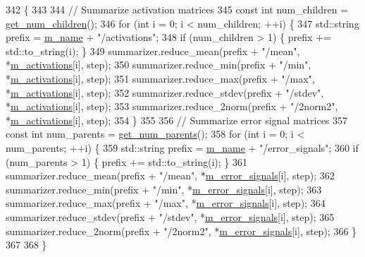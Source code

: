 \begin{DoxyCode}
342                                                                   \{
343 
344   \textcolor{comment}{// Summarize activation matrices}
345   \textcolor{keyword}{const} \textcolor{keywordtype}{int} num\_children = \hyperlink{classlbann_1_1Layer_a1409a117c31a7ea4f2c7a4d22a3e86c3}{get\_num\_children}();
346   \textcolor{keywordflow}{for} (\textcolor{keywordtype}{int} i = 0; i < num\_children; ++i) \{
347     std::string prefix = \hyperlink{classlbann_1_1Layer_aa47109ad09b399142fa92f9d3702189f}{m\_name} + \textcolor{stringliteral}{"/activations"};
348     \textcolor{keywordflow}{if} (num\_children > 1) \{ prefix += std::to\_string(i); \}
349     summarizer.reduce\_mean(prefix + \textcolor{stringliteral}{"/mean"}, *\hyperlink{classlbann_1_1Layer_a7caf08e938141d1584e6939cefa4baed}{m\_activations}[i], step);
350     summarizer.reduce\_min(prefix + \textcolor{stringliteral}{"/min"}, *\hyperlink{classlbann_1_1Layer_a7caf08e938141d1584e6939cefa4baed}{m\_activations}[i], step);
351     summarizer.reduce\_max(prefix + \textcolor{stringliteral}{"/max"}, *\hyperlink{classlbann_1_1Layer_a7caf08e938141d1584e6939cefa4baed}{m\_activations}[i], step);
352     summarizer.reduce\_stdev(prefix + \textcolor{stringliteral}{"/stdev"}, *\hyperlink{classlbann_1_1Layer_a7caf08e938141d1584e6939cefa4baed}{m\_activations}[i], step);
353     summarizer.reduce\_2norm(prefix + \textcolor{stringliteral}{"/2norm2"}, *\hyperlink{classlbann_1_1Layer_a7caf08e938141d1584e6939cefa4baed}{m\_activations}[i], step);
354   \}
355 
356   \textcolor{comment}{// Summarize error signal matrices}
357   \textcolor{keyword}{const} \textcolor{keywordtype}{int} num\_parents = \hyperlink{classlbann_1_1Layer_ac9290d4a6453ccda5f6b4d8b57b49ba3}{get\_num\_parents}();
358   \textcolor{keywordflow}{for} (\textcolor{keywordtype}{int} i = 0; i < num\_parents; ++i) \{
359     std::string prefix = \hyperlink{classlbann_1_1Layer_aa47109ad09b399142fa92f9d3702189f}{m\_name} + \textcolor{stringliteral}{"/error\_signals"};
360     \textcolor{keywordflow}{if} (num\_parents > 1) \{ prefix += std::to\_string(i); \}
361     summarizer.reduce\_mean(prefix + \textcolor{stringliteral}{"/mean"}, *\hyperlink{classlbann_1_1Layer_a452e22ac81c1a799f0614b3e942ea726}{m\_error\_signals}[i], step);
362     summarizer.reduce\_min(prefix + \textcolor{stringliteral}{"/min"}, *\hyperlink{classlbann_1_1Layer_a452e22ac81c1a799f0614b3e942ea726}{m\_error\_signals}[i], step);
363     summarizer.reduce\_max(prefix + \textcolor{stringliteral}{"/max"}, *\hyperlink{classlbann_1_1Layer_a452e22ac81c1a799f0614b3e942ea726}{m\_error\_signals}[i], step);
364     summarizer.reduce\_stdev(prefix + \textcolor{stringliteral}{"/stdev"}, *\hyperlink{classlbann_1_1Layer_a452e22ac81c1a799f0614b3e942ea726}{m\_error\_signals}[i], step);
365     summarizer.reduce\_2norm(prefix + \textcolor{stringliteral}{"/2norm2"}, *\hyperlink{classlbann_1_1Layer_a452e22ac81c1a799f0614b3e942ea726}{m\_error\_signals}[i], step);
366   \}
367 
368 \}
\end{DoxyCode}
